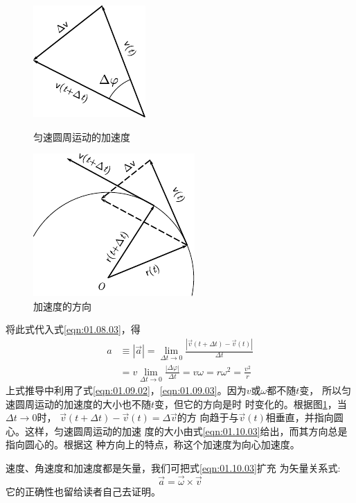 \begin{figure}[!h]
    \small\centering
    \begin{minipage}[b]{14em}
        \includegraphics{figure/fig01.22}
        \vspace{1em}
        \caption{匀速圆周运动的加速度}
        \label{fig:01.22}
    \end{minipage}
    \begin{minipage}[b]{14em}
        \centering
        \includegraphics{figure/fig01.23}
        \caption{加速度的方向}
        \label{fig:01.23}
    \end{minipage}
\end{figure}
\noindent 将此式代入式\eqref{eqn:01.08.03}，得
\begin{equation}\label{eqn:01.10.03}
    \begin{aligned}
        a & \equiv|\vec{a}|=\lim _{\Delta t \rightarrow 0} \frac{|\vec{v}\left(t+\Delta t\right)-\vec{v}\left(t\right)|}{\Delta t} \\
        &=v\lim_{\Delta t \rightarrow 0} \frac{|\Delta \varphi|}{\Delta t}=v \omega=r \omega^{2}=\frac{v^{2}}{r}
    \end{aligned}
\end{equation}\vspace{0.5em}
上式推导中利用了式\eqref{eqn:01.09.02}，\eqref{eqn:01.09.03}。因为$v$或$\omega$都不随$t$变，
所以匀速圆周运动的加速度的大小也不随$t$变，但它的方向是时
时变化的。根据图\ref{fig:01.23}，当$\Delta t\rightarrow 0$时，
$\vec{v}\left(t+ \Delta t\right)-\vec{v}\left(t\right)=\Delta\vec{v}$的方
向趋于与$\vec{v}\left(t\right)$相垂直，并指向圆心。这样，匀速圆周运动的加速
度的大小由式\eqref{eqn:01.10.03}给出，而其方向总是指向圆心的。根据这
种方向上的特点，称这个加速度为向心加速度。

速度、角速度和加速度都是矢量，我们可把式\eqref{eqn:01.10.03}扩充
为矢量关系式:
\clearpage
~\vspace{-1.56em}
\begin{equation}\label{eqn:01.10.04}
    \vec{a}= \vec{\omega}\times \vec{v}
\end{equation}
它的正确性也留给读者自己去证明。